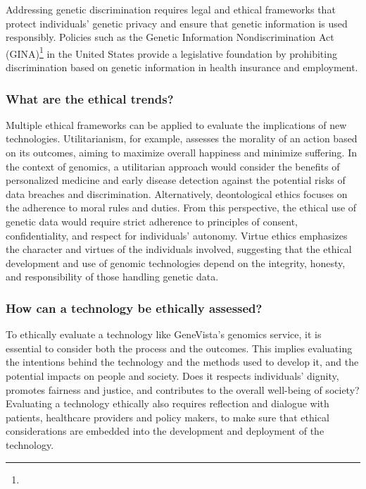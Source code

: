 \documentclass[a4paper]{article}
\begin{document}
Addressing genetic discrimination requires legal and ethical frameworks that protect individuals' genetic privacy and ensure that genetic information is used responsibly. Policies such as the Genetic Information Nondiscrimination Act (GINA)\footnote{\gina} in the United States provide a legislative foundation by prohibiting discrimination based on genetic information in health insurance and employment.

\subsubsection{What are the ethical trends?}

Multiple ethical frameworks can be applied to evaluate the implications of new technologies. Utilitarianism, for example, assesses the morality of an action based on its outcomes, aiming to maximize overall happiness and minimize suffering. In the context of genomics, a utilitarian approach would consider the benefits of personalized medicine and early disease detection against the potential risks of data breaches and discrimination. Alternatively, deontological ethics focuses on the adherence to moral rules and duties. From this perspective, the ethical use of genetic data would require strict adherence to principles of consent, confidentiality, and respect for individuals’ autonomy. Virtue ethics emphasizes the character and virtues of the individuals involved, suggesting that the ethical development and use of genomic technologies depend on the integrity, honesty, and responsibility of those handling genetic data.

\subsubsection{How can a technology be ethically assessed?}

To ethically evaluate a technology like GeneVista’s genomics service, it is essential to consider both the process and the outcomes. This implies evaluating the intentions behind the technology and the methods used to develop it, and the potential impacts on people and society. Does it respects individuals' dignity, promotes fairness and justice, and contributes to the overall well-being of society? Evaluating a technology ethically also requires reflection and dialogue with patients, healthcare providers and policy makers, to make sure that ethical considerations are embedded into the development and deployment of the technology.
\end{document}
